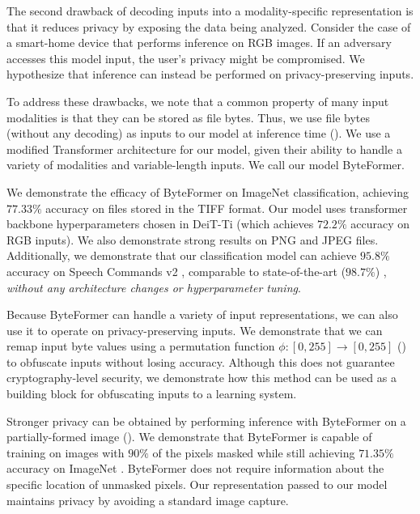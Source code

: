 The second drawback of decoding inputs into a modality-specific representation is that it reduces privacy by exposing the data being analyzed. Consider the case of a smart-home device that performs inference on RGB images. If an adversary accesses this model input, the user's privacy might be compromised. We hypothesize that inference can instead be performed on privacy-preserving inputs.

To address these drawbacks, we note that a common property of many input modalities is that they can be stored as file bytes. Thus, we use file bytes (without any decoding) as inputs to our model at inference time (). We use a modified Transformer \cite{transformer} architecture for our model, given their ability to handle a variety of modalities \cite{perceiverio,unifiedio} and variable-length inputs. We call our model ByteFormer.

We demonstrate the efficacy of ByteFormer on ImageNet \cite{imagenet} classification, achieving $77.33\%$ accuracy on files stored in the TIFF format. Our model uses transformer backbone hyperparameters chosen in DeiT-Ti \cite{deit} (which achieves $72.2\%$ accuracy on RGB inputs). We also demonstrate strong results on PNG and JPEG files. Additionally, we demonstrate that our classification model can achieve $95.8\%$ accuracy on Speech Commands v2 \cite{speechcommands}, comparable to state-of-the-art ($98.7\%$) \cite{bcresnet}, \textit{without any architecture changes or hyperparameter tuning}.

Because ByteFormer can handle a variety of input representations, we can also use it to operate on privacy-preserving inputs. We demonstrate that we can remap input byte values using a permutation function $\phi: [0, 255] \to [0, 255]$ () to obfuscate inputs without losing accuracy. Although this does not guarantee cryptography-level security, we demonstrate how this method can be used as a building block for obfuscating inputs to a learning system.

Stronger privacy can be obtained by performing inference with ByteFormer on a partially-formed image (). We demonstrate that ByteFormer is capable of training on images with $90\%$ of the pixels masked while still achieving $71.35\%$ accuracy on ImageNet \cite{imagenet}. ByteFormer does not require information about the specific location of unmasked pixels. Our representation passed to our model maintains privacy by avoiding a standard image capture.


